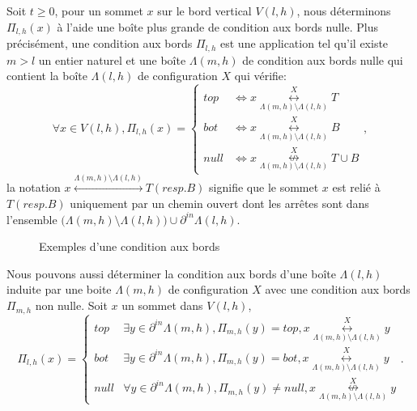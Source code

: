 \documentclass[titlepage,a4paper,12pt]{article}
\newcounter{cor}
\begin{document}
Soit $t\geqslant 0$, pour un sommet $x$ sur le bord vertical $V(l,h)$, nous déterminons $\Pi_{l,h}(x)$ à l'aide une boîte plus grande de condition aux bords nulle. Plus précisément, une condition aux bords $\Pi_{l,h}$ est une application tel qu'il existe $m>l$ un entier naturel et une boîte $\Lambda(m,h)$ de condition aux bords nulle qui contient la boîte $\Lambda(l,h)$ de configuration $X$ qui vérifie:
$$\forall x \in V(l,h),\Pi_{l,h}(x)=\left\lbrace \begin{array}{cl}
top & \Leftrightarrow x\overset{X}{\underset{\Lambda(m,h) \setminus \Lambda(l,h)}{\longleftrightarrow}} T\\
bot & \Leftrightarrow x\overset{X}{\underset{\Lambda(m,h) \setminus \Lambda(l,h)}{\longleftrightarrow}} B\\
null & \Leftrightarrow x\overset{X}{\underset{\Lambda(m,h) \setminus \Lambda(l,h)}{\nleftrightarrow}} T\cup B 
\end{array} \right.,
$$
la notation $x\overset{\Lambda(m,h) \setminus \Lambda(l,h)}{\longleftrightarrow} T(resp. B)$ signifie que le sommet $x$ est relié à $T(resp. B)$ uniquement par un chemin ouvert dont les arrêtes sont dans l'ensemble $\big(\Lambda(m,h) \setminus \Lambda(l,h)\big) \cup \partial^{in} \Lambda(l,h)$. 

\begin{figure}[h]
\center
{}
\caption{Exemples d'une condition aux bords}
\end{figure}

Nous pouvons aussi déterminer la condition aux bords d'une boîte $\Lambda(l,h)$ induite par une boite $\Lambda(m,h)$ de configuration $X$ avec une condition aux bords $\Pi_{m,h}$ non nulle. Soit $x$ un sommet dans $V(l,h)$, 
$$\Pi_{l,h}(x)=\left\lbrace \begin{array}{cl}
top & \exists y \in \partial^{in}\Lambda(m,h), \Pi_{m,h}(y) = top, x\overset{X}{\underset{\Lambda(m,h) \setminus \Lambda(l,h)}{\longleftrightarrow}} y\\
bot & \exists y \in \partial^{in}\Lambda(m,h), \Pi_{m,h}(y) = bot, x\overset{X}{\underset{\Lambda(m,h) \setminus \Lambda(l,h)}{\longleftrightarrow}} y\\
null & \forall y \in \partial^{in}\Lambda(m,h), \Pi_{m,h}(y) \neq null, x\overset{X}{\underset{\Lambda(m,h) \setminus \Lambda(l,h)}{\nleftrightarrow}} y
\end{array} \right..
$$
\end{document}
